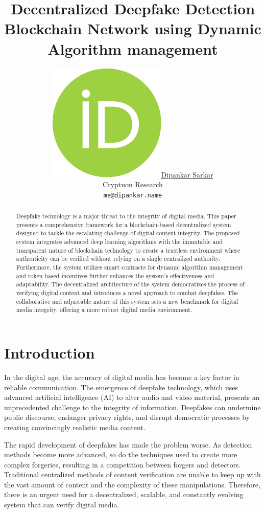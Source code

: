 \documentclass{article}
\title{Decentralized Deepfake Detection Blockchain Network using Dynamic Algorithm management}
\author{ \href{https://orcid.org/0000-0001-5431-6367}{\includegraphics[scale=0.06]{orcid.pdf}\hspace{1mm}Dipankar Sarkar} \\
  Cryptuon Research \\
  \texttt{me@dipankar.name} \\
}
\begin{document}
\maketitle

\begin{abstract}
Deepfake technology is a major threat to the integrity of digital media. This paper presents a comprehensive framework for a blockchain-based decentralized system designed to tackle the escalating challenge of digital content integrity. The proposed system integrates advanced deep learning algorithms with the immutable and transparent nature of blockchain technology to create a trustless environment where authenticity can be verified without relying on a single centralized authority. Furthermore, the system utilizes smart contracts for dynamic algorithm management and token-based incentives further enhances the system's effectiveness and adaptability. The decentralized architecture of the system democratizes the process of verifying digital content and introduces a novel approach to combat deepfakes. The collaborative and adjustable nature of this system sets a new benchmark for digital media integrity, offering a more robust digital media environment.
\end{abstract}



\section{Introduction}
In the digital age, the accuracy of digital media has become a key factor in reliable communication. The emergence of deepfake technology, which uses advanced artificial intelligence (AI) to alter audio and video material, presents an unprecedented challenge to the integrity of information. Deepfakes can undermine public discourse, endanger privacy rights, and disrupt democratic processes by creating convincingly realistic media content.

The rapid development of deepfakes has made the problem worse. As detection methods become more advanced, so do the techniques used to create more complex forgeries, resulting in a competition between forgers and detectors. Traditional centralized methods of content verification are unable to keep up with the vast amount of content and the complexity of these manipulations. Therefore, there is an urgent need for a decentralized, scalable, and constantly evolving system that can verify digital media.
\end{document}
